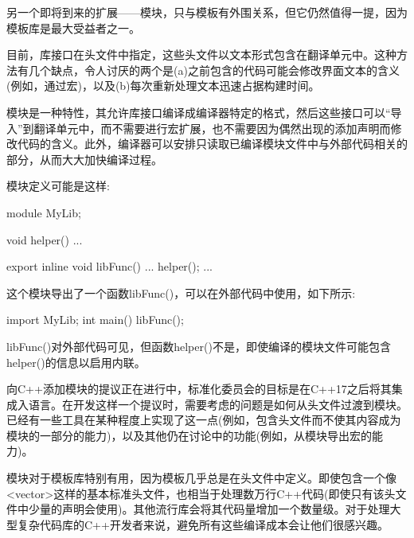 另一个即将到来的扩展——模块，只与模板有外围关系，但它仍然值得一提，因为模板库是最大受益者之一。

目前，库接口在头文件中指定，这些头文件以文本形式包含在翻译单元中。这种方法有几个缺点，令人讨厌的两个是(a)之前包含的代码可能会修改界面文本的含义(例如，通过宏)，以及(b)每次重新处理文本迅速占据构建时间。

模块是一种特性，其允许库接口编译成编译器特定的格式，然后这些接口可以“导入”到翻译单元中，而不需要进行宏扩展，也不需要因为偶然出现的添加声明而修改代码的含义。此外，编译器可以安排只读取已编译模块文件中与外部代码相关的部分，从而大大加快编译过程。

模块定义可能是这样:

\begin{cpp}
module MyLib;

void helper() {
	...
}

export inline void libFunc() {
	...
	helper();
	...
}
\end{cpp}

这个模块导出了一个函数libFunc()，可以在外部代码中使用，如下所示:

\begin{cpp}
import MyLib;
int main() {
	libFunc();
}
\end{cpp}

libFunc()对外部代码可见，但函数helper()不是，即使编译的模块文件可能包含helper()的信息以启用内联。

向C++添加模块的提议正在进行中，标准化委员会的目标是在C++17之后将其集成入语言。在开发这样一个提议时，需要考虑的问题是如何从头文件过渡到模块。已经有一些工具在某种程度上实现了这一点(例如，包含头文件而不使其内容成为模块的一部分的能力)，以及其他仍在讨论中的功能(例如，从模块导出宏的能力)。

模块对于模板库特别有用，因为模板几乎总是在头文件中定义。即使包含一个像<vector>这样的基本标准头文件，也相当于处理数万行C++代码(即使只有该头文件中少量的声明会使用)。其他流行库会将其代码量增加一个数量级。对于处理大型复杂代码库的C++开发者来说，避免所有这些编译成本会让他们很感兴趣。































